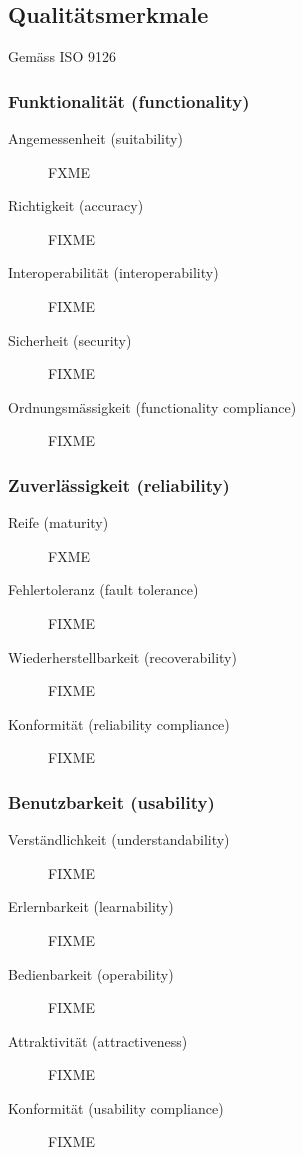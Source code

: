 \documentclass[a4paper]{article}
\begin{document}
\subsection{Qualitätsmerkmale}

Gemäss ISO 9126

\subsubsection{Funktionalität (functionality)}

\begin{description}
  \item[Angemessenheit (suitability)]
    FXME
  \item[Richtigkeit (accuracy)]
    FIXME
  \item[Interoperabilität (interoperability)]
    FIXME
  \item[Sicherheit (security)]
    FIXME
  \item[Ordnungsmässigkeit (functionality compliance)]
    FIXME
\end{description}

\subsubsection{Zuverlässigkeit (reliability)}

\begin{description}
  \item[Reife (maturity)]
    FXME
  \item[Fehlertoleranz (fault tolerance)]
    FIXME
  \item[Wiederherstellbarkeit (recoverability)]
    FIXME
  \item[Konformität (reliability compliance)]
    FIXME
\end{description}

\subsubsection{Benutzbarkeit (usability)}

\begin{description}
  \item[Verständlichkeit (understandability)]
    FIXME
  \item[Erlernbarkeit (learnability)]
    FIXME
  \item[Bedienbarkeit (operability)]
    FIXME
  \item[Attraktivität (attractiveness)]
    FIXME
  \item[Konformität (usability compliance)]
    FIXME
\end{description}
\end{document}
